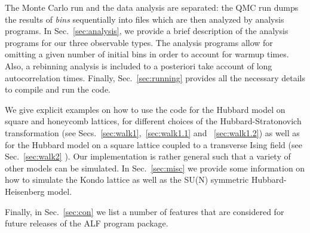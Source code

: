 The Monte Carlo run and the  data analysis  are separated: the QMC run  dumps the results of \textit{bins}  sequentially into files  which are then analyzed by  analysis programs. In Sec.~\ref{sec:analysis}, we provide a brief description of the analysis programs  for our three observable types.  The analysis programs allow for omitting a given number of initial bins in order to account for warmup times. Also, a rebinning analysis is included  to a posteriori take  account of long autocorrelation times.  Finally, Sec.~\ref{sec:running} provides all the necessary details  to compile and run the code. 


We  give explicit examples on how to use the code for  the  Hubbard model on square and honeycomb lattices,  for different choices of the Hubbard-Stratonovich transformation  (see Secs.~\ref{sec:walk1},~\ref{sec:walk1.1} and ~\ref{sec:walk1.2})  as well as for the Hubbard model on a square lattice coupled to a transverse Ising field (see Sec.~\ref{sec:walk2} ).   Our implementation is rather general such that  a variety of other models can be simulated. In Sec.~\ref{sec:misc}   we provide  some information on how to simulate the Kondo lattice as well as the SU(N) symmetric Hubbard-Heisenberg model. 

Finally, in Sec.~\ref{sec:con} we list a number of features that are considered for  future releases of the ALF program package.
